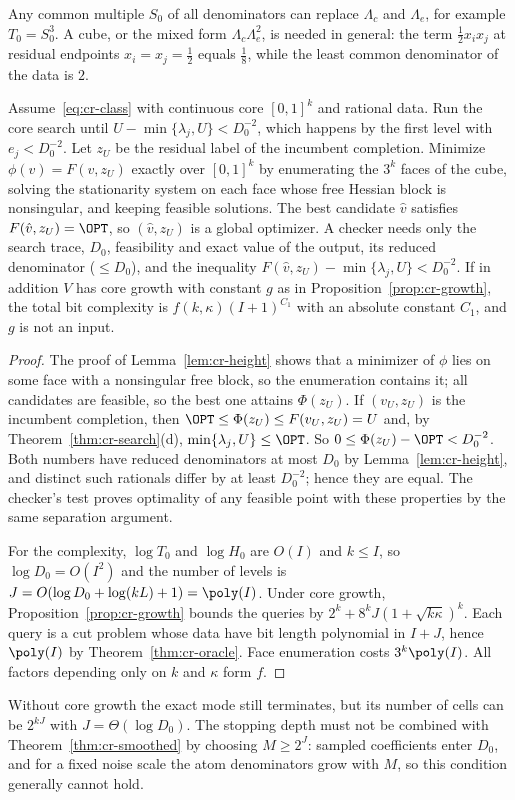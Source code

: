 \begin{remark}
Any common multiple $S_0$ of all denominators can replace $\Lambda_c$ and
$\Lambda_e$, for example $T_0=S_0^3$. A cube, or the mixed form
$\Lambda_c\Lambda_e^2$, is needed in general: the term $\frac12x_ix_j$ at
residual endpoints $x_i=x_j=\frac12$ equals $\frac18$, while the least
common denominator of the data is $2$.
\end{remark}

\begin{theorem}\label{thm:cr-exact}
Assume~\eqref{eq:cr-class} with continuous core $[0,1]^k$ and rational data.
Run the core search until $U-\min\{\lambda_j,U\}<D_0^{-2}$, which happens
by the first level with $e_j<D_0^{-2}$. Let $z_U$ be the residual label
of the incumbent completion. Minimize $\phi(v)=F(v,z_U)$ exactly over
$[0,1]^k$ by enumerating the $3^k$ faces of the cube, solving the
stationarity system on each face whose free Hessian block is nonsingular,
and keeping feasible solutions. The best candidate $\hat v$ satisfies
$F(\hat v,z_U)=\OPT$, so $(\hat v,z_U)$ is a global optimizer. A checker
needs only the search trace, $D_0$, feasibility and exact value of the
output, its reduced denominator ($\le D_0$), and the inequality
$F(\hat v,z_U)-\min\{\lambda_j,U\}<D_0^{-2}$.
If in addition $V$ has core growth with constant $g$ as in
Proposition~\ref{prop:cr-growth}, the total bit complexity is
$f(k,\kappa)(I+1)^{C_1}$ with an absolute constant $C_1$, and $g$ is not
an input.
\end{theorem}
\begin{proof}
The proof of Lemma~\ref{lem:cr-height} shows that a minimizer of $\phi$
lies on some face with a nonsingular free block, so the enumeration
contains it; all candidates are feasible, so the best one attains
$\Phi(z_U)$. If $(v_U,z_U)$ is the incumbent completion, then
$\OPT\le\Phi(z_U)\le F(v_U,z_U)=U$ and, by Theorem~\ref{thm:cr-search}(d),
$\min\{\lambda_j,U\}\le\OPT$. So $0\le\Phi(z_U)-\OPT<D_0^{-2}$. Both
numbers have reduced denominators at most $D_0$ by
Lemma~\ref{lem:cr-height}, and distinct such rationals differ by at least
$D_0^{-2}$; hence they are equal. The checker's test proves optimality of
any feasible point with these properties by the same separation argument.

For the complexity, $\log T_0$ and $\log H_0$ are $O(I)$ and $k\le I$, so
$\log D_0=O(I^2)$ and the number of levels is
$J=O(\log D_0+\log(kL)+1)=\poly(I)$. Under core growth,
Proposition~\ref{prop:cr-growth} bounds the queries by
$2^k+8^kJ(1+\sqrt{k\kappa})^k$. Each query is a cut problem whose data have
bit length polynomial in $I+J$, hence $\poly(I)$ by
Theorem~\ref{thm:cr-oracle}. Face enumeration costs $3^k\poly(I)$. All
factors depending only on $k$ and $\kappa$ form $f$.
\end{proof}

Without core growth the exact mode still terminates, but its number of
cells can be $2^{kJ}$ with $J=\Theta(\log D_0)$. The stopping depth must
not be combined with Theorem~\ref{thm:cr-smoothed} by choosing
$M\ge2^{J}$: sampled coefficients enter $D_0$, and for a fixed noise scale
the atom denominators grow with $M$, so this condition generally cannot
hold.

